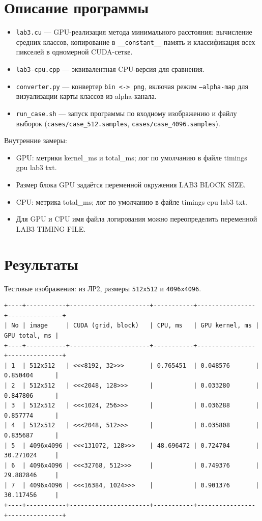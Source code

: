 \documentclass[a4paper,14pt]{extarticle}
\begin{document}
\section*{Описание программы}
\begin{itemize}
    \item \texttt{lab3.cu} --- GPU-реализация метода минимального расстояния:
    вычисление средних классов, копирование в \verb|__constant__| память и
    классификация всех пикселей в одномерной CUDA-сетке.
    \item \texttt{lab3-cpu.cpp} --- эквивалентная CPU-версия для сравнения.
    \item \texttt{converter.py} --- конвертер \texttt{bin <-> png}, включая
    режим \texttt{--alpha-map} для визуализации карты классов из alpha-канала.
    \item \texttt{run\_case.sh} --- запуск программы по входному изображению и
    файлу выборок (\texttt{cases/case\_512.samples}, \texttt{cases/case\_4096.samples}).
\end{itemize}

Внутренние замеры:
{\small
\begin{itemize}
    \item GPU: метрики kernel\_ms и total\_ms; лог по умолчанию в файле
    timings gpu lab3 txt.
    \item Размер блока GPU задаётся переменной окружения LAB3 BLOCK SIZE.
    \item CPU: метрика total\_ms; лог по умолчанию в файле
    timings cpu lab3 txt.
    \item Для GPU и CPU имя файла логирования можно переопределить
    переменной LAB3 TIMING FILE.
\end{itemize}
}

\section*{Результаты}
Тестовые изображения: из ЛР2, размеры \texttt{512x512} и \texttt{4096x4096}.

\begin{lstlisting}[basicstyle=\ttfamily\scriptsize,frame=single]
+----+-----------+----------------------+-----------+----------------+---------------+
| No | image     | CUDA (grid, block)   | CPU, ms   | GPU kernel, ms | GPU total, ms |
+----+-----------+----------------------+-----------+----------------+---------------+
| 1  | 512x512   | <<<8192, 32>>>       | 0.765451  | 0.048576       | 0.850404      |
| 2  | 512x512   | <<<2048, 128>>>      |           | 0.033280       | 0.847806      |
| 3  | 512x512   | <<<1024, 256>>>      |           | 0.036288       | 0.857774      |
| 4  | 512x512   | <<<2048, 512>>>      |           | 0.035808       | 0.835687      |
| 5  | 4096x4096 | <<<131072, 128>>>    | 48.696472 | 0.724704       | 30.271024     |
| 6  | 4096x4096 | <<<32768, 512>>>     |           | 0.749376       | 29.882846     |
| 7  | 4096x4096 | <<<16384, 1024>>>    |           | 0.901376       | 30.117456     |
+----+-----------+----------------------+-----------+----------------+---------------+
\end{lstlisting}
\end{document}
